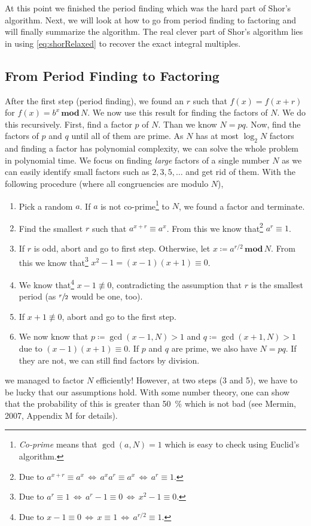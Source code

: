 					At this point we finished the period finding which was the hard part of Shor's algorithm. Next, we will look at how to go from period finding to factoring and will finally summarize the algorithm. The real clever part of Shor's algorithm lies in using \eqref{eq:shorRelaxed} to recover the exact integral multiples.


		\subsection{From Period Finding to Factoring}
			After the first step (period finding), we found an \(r\) such that \( f(x) = f(x + r) \) for \( f(x) = b^x \,\mathbf{mod}\, N \). We now use this result for finding the factors of \(N\). We do this recursively. First, find a factor \(p\) of \(N\). Than we know \(N = p q\). Now, find the factors of \(p\) and \(q\) until all of them are prime. As \(N\) has at most \(\log_2 N\) factors and finding a factor has polynomial complexity, we can solve the whole problem in polynomial time. We focus on finding \emph{large} factors of a single number \(N\) as we can easily identify small factors such as \( 2, 3, 5, \dots \) and get rid of them. With the following procedure (where all congruencies are modulo \(N\)),
			\begin{enumerate}
				\item Pick a random \(a\). If \(a\) is not co-prime\footnote{\emph{Co-prime} means that \( \gcd(a, N) = 1 \) which is easy to check using Euclid's algorithm.} to \(N\), we found a factor and terminate.
				\item Find the smallest \(r\) such that \( a^{x + r} \equiv a^x \). From this we know that\footnote{Due to \( a^{x + r} \equiv a^x \,\iff\, a^x a^r \equiv a^x \,\iff\, a^r \equiv 1 \).} \( a^r \equiv 1 \).
				\item If \(r\) is odd, abort and go to first step. Otherwise, let \( x \coloneqq a^{r/2} \,\mathbf{mod}\, N \). From this we know that\footnote{Due to \( a^r \equiv 1 \,\iff\, a^r - 1 \equiv 0 \,\iff\, x^2 - 1 \equiv 0 \).} \( x^2 - 1 = (x - 1) (x + 1) \equiv 0 \).
				\item We know that\footnote{Due to \( x - 1 \equiv 0 \,\iff\, x \equiv 1 \,\iff\, a^{r/2} \equiv 1 \).} \( x - 1 \not\equiv 0 \), contradicting the assumption that \(r\) is the smallest period (as \(\sfrac{r}{2}\) would be one, too).
				\item If \( x + 1 \not\equiv 0 \), abort and go to the first step.
				\item We now know that \( p \coloneqq \gcd(x - 1, N) > 1 \) and \( q \coloneqq \gcd(x + 1, N) > 1 \) due to \( (x - 1) (x + 1) \equiv 0 \). If \(p\) and \(q\) are prime, we also have \( N = p q \). If they are not, we can still find factors by division.
			\end{enumerate}
			we managed to factor \(N\) efficiently! However, at two steps (3 and 5), we have to be lucky that our assumptions hold. With some number theory, one can show that the probability of this is greater than \SI{50}{\percent} which is not bad (see Mermin, 2007, Appendix M for details).


